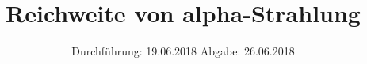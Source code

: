

\subject{V701}
\title{Reichweite von alpha-Strahlung}
\date{%
  Durchführung: 19.06.2018
  \hspace{3em}
  Abgabe: 26.06.2018
}



\maketitle
\thispagestyle{empty}
\tableofcontents
\newpage






\printbibliography{}


